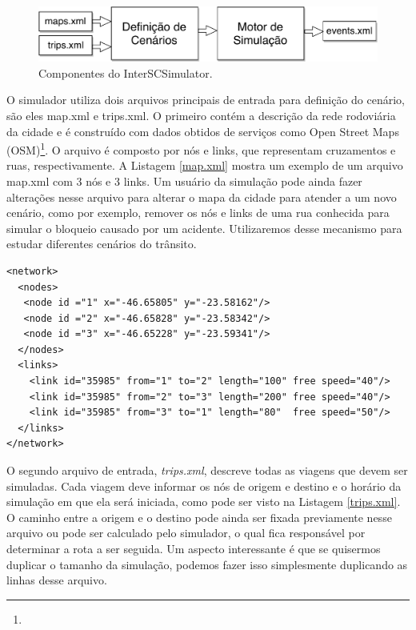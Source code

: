 {\begin{figure}[!htb]
  \centering
  \includegraphics[width=\textwidth]{../figuras/arquitetura-simulador.pdf}
  \caption[Componentes do InterSCSimulator]{Componentes do InterSCSimulator. \label{fig:interscsimulator}}
\end{figure}

  O simulador utiliza dois arquivos principais de entrada para definição do
cenário, são eles map.xml e trips.xml. O primeiro contém a descrição da rede
rodoviária da cidade e é construído com dados obtidos de serviços como Open
Street Maps (OSM)\footnote{}. O arquivo é composto por
nós e links, que representam cruzamentos e ruas, respectivamente. A Listagem
\ref{map.xml} mostra um exemplo de um arquivo map.xml com 3 nós e 3 links. Um
usuário da simulação pode ainda fazer alterações nesse arquivo para alterar o
mapa da cidade para atender a um novo cenário, como por exemplo, remover os nós
e links de uma rua conhecida para simular o bloqueio causado por um acidente.
Utilizaremos desse mecanismo para estudar diferentes cenários do trânsito.

\begin{lstlisting}[style=myxml, caption={Exemplo de arquivo map.xml que define a rede rodoviária da cidade. Fonte: \citet{mabs2017}}, label=map.xml]
<network>
  <nodes>
   <node id ="1" x="-46.65805" y="-23.58162"/>
   <node id ="2" x="-46.65828" y="-23.58342"/>
   <node id ="3" x="-46.65228" y="-23.59341"/>
  </nodes>
  <links>
    <link id="35985" from="1" to="2" length="100" free speed="40"/>
    <link id="35985" from="2" to="3" length="200" free speed="40"/>
    <link id="35985" from="3" to="1" length="80"  free speed="50"/>
  </links>
</network>
\end{lstlisting}

  O segundo arquivo de entrada, \emph{trips.xml}, descreve todas as viagens que
devem ser simuladas. Cada viagem deve informar os nós de origem e destino e o
horário da simulação em que ela será iniciada, como pode ser visto na Listagem
\ref{trips.xml}. O caminho entre a origem e o destino pode ainda ser fixada
previamente nesse arquivo ou pode ser calculado pelo simulador, o qual fica
responsável por determinar a rota a ser seguida. Um aspecto interessante é que
se quisermos duplicar o tamanho da simulação, podemos fazer isso simplesmente
duplicando as linhas desse arquivo.

}
